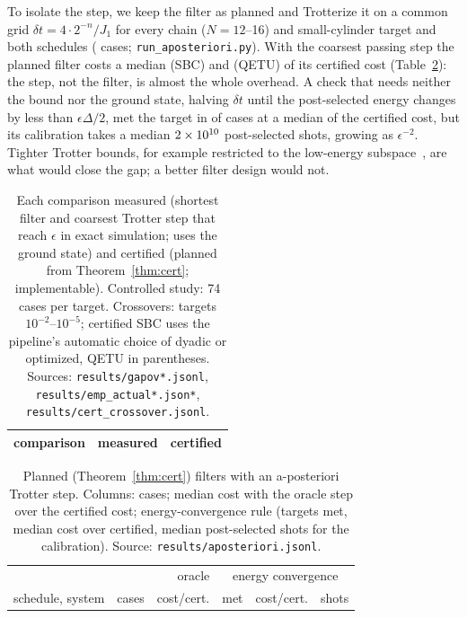 \documentclass[aps,pra,twocolumn,superscriptaddress,nofootinbib]{revtex4-2}
\begin{document}
To isolate the step, we keep the filter as planned and Trotterize it on a common grid $\delta t=4\cdot2^{-n}/J_1$ for
every chain ($N=12$--16) and small-cylinder target and both schedules (\apN{} cases; \texttt{run\_aposteriori.py}).
With the coarsest passing step the planned filter costs a median \apOrCertS{} (SBC) and \apOrCertQ{} (QETU) of its
certified cost (Table~\ref{tab:apost}): the step, not the filter, is almost the whole overhead. A check that needs
neither the bound nor the ground state, halving $\delta t$ until the post-selected energy changes by less than
$\epsilon\Delta/2$, met the target in \apEok{} of \apEtot{} cases at a median \apEcertS{} of the certified cost, but
its calibration takes a median $2\times10^{10}$ post-selected shots, growing as $\epsilon^{-2}$. Tighter Trotter bounds,
for example restricted to the low-energy subspace~\cite{Sahinoglu2021,Mizuta2025}, are what would close the gap; a
better filter design would not.

\begin{table}[t]
\caption{Each comparison measured (shortest filter and coarsest Trotter step that reach $\epsilon$ in exact
simulation; uses the ground state) and certified (planned from Theorem~\ref{thm:cert}; implementable).
Controlled study: 74 cases per target. Crossovers: targets $10^{-2}$--$10^{-5}$; certified SBC uses the
pipeline's automatic choice of dyadic or optimized, QETU in parentheses. Sources: \texttt{results/gapov*.jsonl},
\texttt{results/emp\_actual*.json*}, \texttt{results/cert\_crossover.jsonl}.}
\label{tab:meascert}
\begin{ruledtabular}
\begin{tabular}{p{4.2cm}ll}
comparison & measured & certified\\
\midrule

\end{tabular}
\end{ruledtabular}
\end{table}

\begin{table}[t]
\caption{Planned (Theorem~\ref{thm:cert}) filters with an a-posteriori Trotter step. Columns: cases; median cost
with the oracle step over the certified cost; energy-convergence rule (targets met, median cost over certified,
median post-selected shots for the calibration).
Source: \texttt{results/aposteriori.jsonl}.}
\label{tab:apost}
\begin{ruledtabular}
\begin{tabular}{lrrrrr}
 & & oracle & \multicolumn{3}{c}{energy convergence}\\
schedule, system & cases & cost/cert. & met & cost/cert. & shots\\
\midrule

\end{tabular}
\end{ruledtabular}
\end{table}
\end{document}
